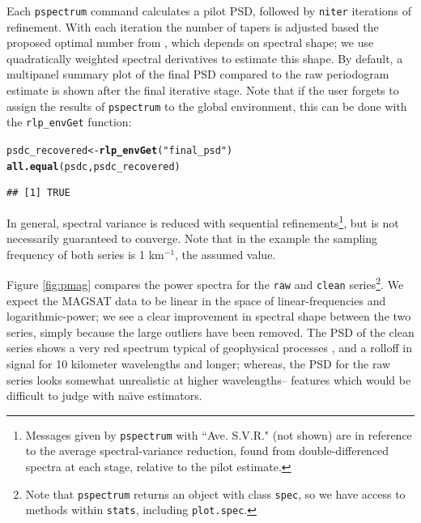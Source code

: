 \documentclass{article}\usepackage{graphicx, color}
\makeatletter
\newcommand{\hlfunctioncall}[1]{\textcolor[rgb]{0.501960784313725,0,0.329411764705882}{\textbf{#1}}}%
\newcommand{\hlstring}[1]{\textcolor[rgb]{0.6,0.6,1}{#1}}%
\newenvironment{kframe}{%
 \def\at@end@of@kframe{}%
 \ifinner\ifhmode%
  \def\at@end@of@kframe{\end{minipage}}%
  \begin{minipage}{\columnwidth}%
 \fi\fi%
 \def\FrameCommand##1{\hskip\@totalleftmargin \hskip-\fboxsep
 \colorbox{shadecolor}{##1}\hskip-\fboxsep
     \hskip-\linewidth \hskip-\@totalleftmargin \hskip\columnwidth}%
 \MakeFramed {\advance\hsize-\width
   \@totalleftmargin\z@ \linewidth\hsize
   \@setminipage}}%
 {\par\unskip\endMakeFramed%
 \at@end@of@kframe}
\newenvironment{knitrout}{}{} %
\newcommand{\Rcmd}[1]{\texttt{#1}}
\newcommand{\naive}[0]{na\"{\i}ve}
\makeatother
\begin{document}
Each  \Rcmd{pspectrum} command calculates a pilot PSD, followed by 
\Rcmd{niter}
iterations of refinement.
With each iteration
the number of tapers is adjusted 
based the proposed optimal number from \citet{rs1995}, which
depends on spectral shape; we use 
quadratically weighted spectral derivatives to estimate this shape.
By default, a multipanel summary plot of the final PSD compared
to the raw periodogram estimate is shown after the final iterative stage.
Note that if the user forgets to assign the results of
\Rcmd{pspectrum} to the global environment, this can be
done with the \Rcmd{rlp\_envGet} function:
\begin{knitrout}
\color{fgcolor}\begin{kframe}
\begin{alltt}
psdc_recovered <- \hlfunctioncall{rlp_envGet}(\hlstring{"final_psd"})
\hlfunctioncall{all.equal}(psdc, psdc_recovered)
\end{alltt}
\begin{verbatim}
## [1] TRUE
\end{verbatim}
\end{kframe}
\end{knitrout}


In general, spectral variance is reduced
with sequential refinements\footnote{
Messages given by \Rcmd{pspectrum} with
``Ave. S.V.R."  (not shown)
are in reference to the 
 average spectral-variance reduction, found from
 double-differenced spectra at each stage, relative
 to the pilot estimate.
}, but is not necessarily guaranteed to converge.
Note that in the example
the sampling frequency of both series
is 1 km$^{-1}$, the assumed value.

Figure \ref{fig:pmag} compares the 
power spectra for the \Rcmd{raw} and \Rcmd{clean} 
series\footnote{
Note that \Rcmd{pspectrum} returns
an object with class \Rcmd{spec}, so we have access to methods 
within \Rcmd{stats}, including \Rcmd{plot.spec}.
}.  
We expect the MAGSAT data to be linear in the space of
linear-frequencies and logarithmic-power;
we see a clear
improvement in spectral shape between the two series,
simply because the large outliers have been removed.
The PSD of the clean series shows a
very red spectrum typical of geophysical processes \citep{agnew1992},
and
a rolloff in signal
for 10 kilometer wavelengths and longer; whereas, the 
PSD for the raw series looks somewhat unrealistic at higher wavelengths--
features which would be difficult to judge with \naive{} estimators.
\end{document}
